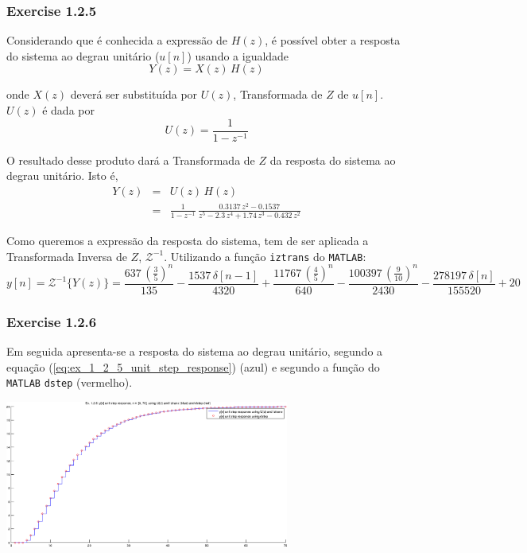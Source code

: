 \documentclass[a4paper]{article}
\begin{document}
\subsubsection{Exercise 1.2.5}
\label{subsubsec:ex_1_2_5}
\noindent Considerando que é conhecida a expressão de $H(z)$, é possível obter a resposta do sistema ao degrau unitário ($u[n]$) usando a igualdade
\begin{equation}
	\label{eq:ex_1_2_5_system_response}
	Y(z) = X(z) \, H(z)
\end{equation}

\noindent onde $X(z)$ deverá ser substituída por $U(z)$, Transformada de $Z$ de $u[n]$. $U(z)$ é dada por
\begin{equation}
	\label{eq:ex_1_2_5_unit_step_response_ztrans}
	U(z) = \frac{1}{1 - z^{-1}}
\end{equation}

\noindent O resultado desse produto dará a Transformada de $Z$ da resposta do sistema ao degrau unitário. Isto é,
\begin{eqnarray}
	\label{eqnarr:ex_1_2_5_unit_step_response_ztrans_replace}
	Y(z) & = & U(z) \, H(z) \\
	& = & \frac{1}{1 - z^{-1}} \, \frac{0.3137 \, z^{2} - 0.1537}{z^{5} - 2.3 \, z^{4} + 1.74 \, z^{3} - 0.432 \, z^{2}}
\end{eqnarray}

\noindent Como queremos a expressão da resposta do sistema, tem de ser aplicada a Transformada Inversa de $Z$, $\mathcal{Z}^{-1}$. Utilizando a função \texttt{iztrans} do \texttt{MATLAB}:
\begin{equation}
	\label{eq:ex_1_2_5_unit_step_response}
	y[n] = \mathcal{Z}^{-1}\{Y(z)\} = \frac{637 \, \left(\frac{3}{5}\right)^n}{135} - \frac{1537 \, \delta[n - 1]}{4320} + \frac{11767 \, \left(\frac{4}{5}\right)^n}{640} - \frac{100397 \, \left(\frac{9}{10}\right)^n}{2430} - \frac{278197 \, \delta[n]}{155520} + 20
\end{equation}

\clearpage
\subsubsection{Exercise 1.2.6}
\noindent Em seguida apresenta-se a resposta do sistema ao degrau unitário, segundo a equação (\ref{eq:ex_1_2_5_unit_step_response}) (azul) e segundo a função do \texttt{MATLAB} \texttt{dstep} (vermelho).
\begin{center}
	\includegraphics[width=0.70\textwidth]{images/ex1_2_6.png}
	\label{fig:ex1_2_6}
\end{center}
\end{document}
